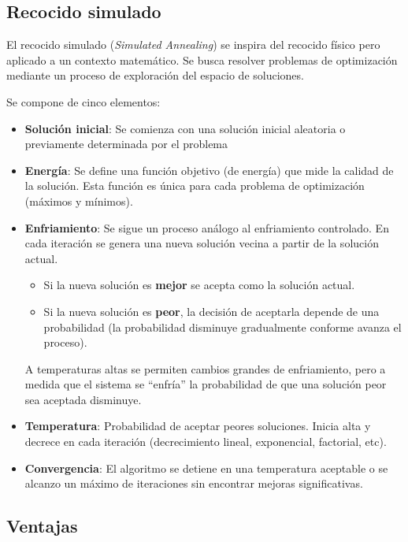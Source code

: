 \documentclass[12pt,twoside]{article}
\begin{document}
	\subsection{Recocido simulado}

	El recocido simulado (\textit{Simulated Annealing}) se inspira del recocido físico pero aplicado a un contexto matemático. Se busca resolver problemas de optimización mediante un proceso de exploración del espacio de soluciones.
	
	Se compone de cinco elementos:
	\begin{itemize}
		\item \textbf{Solución inicial}: Se comienza con una solución inicial aleatoria o previamente determinada por el problema
		
		\item \textbf{Energía}: Se define una función objetivo (de energía) que mide la calidad de la solución. Esta función es única para cada problema de optimización (máximos y mínimos).
		
		\item \textbf{Enfriamiento}: Se sigue un proceso análogo al enfriamiento controlado. En cada iteración se genera una nueva solución vecina a partir de la solución actual. 
		
		\begin{itemize}
			\item Si la nueva solución es \textbf{mejor} se acepta como la solución actual.
			\item Si la nueva solución es \textbf{peor}, la decisión de aceptarla depende de una probabilidad (la probabilidad disminuye gradualmente conforme avanza el proceso).
		\end{itemize}
		
		A temperaturas altas se permiten cambios grandes de enfriamiento, pero a medida que el sistema se ``enfría'' la probabilidad de que una solución peor sea aceptada disminuye.
		
		\item \textbf{Temperatura}: Probabilidad de aceptar peores soluciones. Inicia alta y decrece en cada iteración (decrecimiento lineal, exponencial, factorial, etc).
		
		\item \textbf{Convergencia}: El algoritmo se detiene en una temperatura aceptable o se alcanzo un máximo de iteraciones sin encontrar mejoras significativas.
	\end{itemize}
	\subsection{Ventajas}
	
\end{document}
